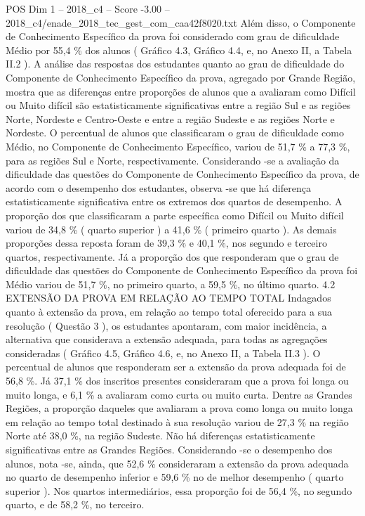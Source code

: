 \begin{textsample}{POS Dim 1 – 2018\_c4 – Score -3.00 – 2018\_c4/enade\_2018\_tec\_gest\_com\_caa42f8020.txt}
Além disso, o Componente de Conhecimento Específico da prova foi considerado com grau de dificuldade Médio por 55,4 \% dos alunos ( Gráfico 4.3, Gráfico 4.4, e, no Anexo II, a Tabela II.2 ).
A análise das respostas dos estudantes quanto ao grau de dificuldade do Componente de Conhecimento Específico da prova, agregado por Grande Região, mostra que as diferenças entre proporções de alunos que a avaliaram como Difícil ou Muito difícil são estatisticamente significativas entre a região Sul e as regiões Norte, Nordeste e Centro-Oeste e entre a região Sudeste e as regiões Norte e Nordeste.
O percentual de alunos que classificaram o grau de dificuldade como Médio, no Componente de Conhecimento Específico, variou de 51,7 \% a 77,3 \%, para as regiões Sul e Norte, respectivamente.
Considerando -se a avaliação da dificuldade das questões do Componente de Conhecimento Específico da prova, de acordo com o desempenho dos estudantes, observa -se que há diferença estatisticamente significativa entre os extremos dos quartos de desempenho.
A proporção dos que classificaram a parte específica como Difícil ou Muito difícil variou de 34,8 \% ( quarto superior ) a 41,6 \% ( primeiro quarto ).
As demais proporções dessa reposta foram de 39,3 \% e 40,1 \%, nos segundo e terceiro quartos, respectivamente.
Já a proporção dos que responderam que o grau de dificuldade das questões do Componente de Conhecimento Específico da prova foi Médio variou de 51,7 \%, no primeiro quarto, a 59,5 \%, no último quarto. 4.2 EXTENSÃO DA PROVA EM RELAÇÃO AO TEMPO TOTAL Indagados quanto à extensão da prova, em relação ao tempo total oferecido para a sua resolução ( Questão 3 ), os estudantes apontaram, com maior incidência, a alternativa que considerava a extensão adequada, para todas as agregações consideradas ( Gráfico 4.5, Gráfico 4.6, e, no Anexo II, a Tabela II.3 ).
O percentual de alunos que responderam ser a extensão da prova adequada foi de 56,8 \%.
Já 37,1 \% dos inscritos presentes consideraram que a prova foi longa ou muito longa, e 6,1 \% a avaliaram como curta ou muito curta.
Dentre as Grandes Regiões, a proporção daqueles que avaliaram a prova como longa ou muito longa em relação ao tempo total destinado à sua resolução variou de 27,3 \% na região Norte até 38,0 \%, na região Sudeste.
Não há diferenças estatisticamente significativas entre as Grandes Regiões.
Considerando -se o desempenho dos alunos, nota -se, ainda, que 52,6 \% consideraram a extensão da prova adequada no quarto de desempenho inferior e 59,6 \% no de melhor desempenho ( quarto superior ).
Nos quartos intermediários, essa proporção foi de 56,4 \%, no segundo quarto, e de 58,2 \%, no terceiro.

\end{textsample}
